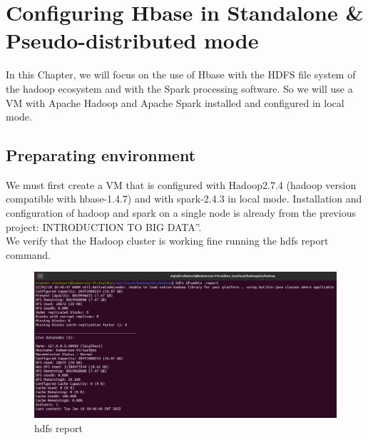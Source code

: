 \chapter{Configuring Hbase in Standalone \& Pseudo-distributed mode}
\par In this Chapter, we will focus on the use of Hbase with the HDFS file system of
the hadoop ecosystem and with the Spark processing software. So we will use a VM with
Apache Hadoop and Apache Spark installed and configured in local mode.
\begin{spacing}{1.2}
\section{Preparating environment }
\par We must first create a VM that is configured with Hadoop2.7.4 (hadoop version compatible with hbase-1.4.7) and with spark-2.4.3 in local mode. Installation and configuration of hadoop and spark on a single node is already from the previous project: INTRODUCTION TO BIG DATA”.\\
We verify that the Hadoop cluster is working fine running the hdfs report command.
\\
\begin{figure}[!htb] 
\begin{center} 
\includegraphics[width=1\linewidth]{Pictures/HBase/Configuring Hbase in Standalone & Pseudo-distributed mode/Preparating environment/hdfs report} 
\end{center} 
\caption{hdfs report} 
\end{figure}  \FloatBarrier
\\
\newpage

\end{spacing}
